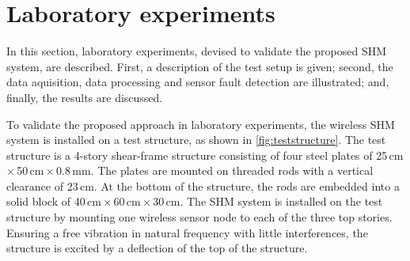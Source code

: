 \documentclass[12pt,a4paper]{scrartcl}
\begin{document}
\section*{Laboratory experiments}
In this section, laboratory experiments, devised to validate the proposed SHM system, are described.
First, a description of the test setup is given; second, the data aquisition, data processing and sensor fault detection are illustrated; and, finally, the results are discussed. 

To validate the proposed approach in laboratory experiments, the wireless SHM system is installed on a test structure, as shown in \autoref{fig:teststructure}.
The test structure is a 4-story shear-frame structure consisting of four steel plates of 25\,cm\,$\times$\,50\,cm\,$\times$\,0.8\,mm.
The plates are mounted on threaded rods with a vertical clearance of 23\,cm.
At the bottom of the structure, the rods are embedded into a solid block of 40\,cm\,$\times$\,60\,cm\,$\times$\,30\,cm.
The SHM system is installed on the test structure by mounting one wireless sensor node to each of the three top stories.
Ensuring a free vibration in natural frequency with little interferences, the structure is excited by a deflection of the top of the structure.
\end{document}
